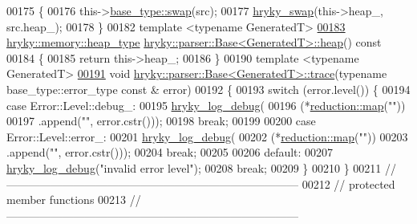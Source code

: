 \begin{DoxyCode}
00175 \{
00176     this->\hyperlink{namespacehryky_1_1parser_acbeac181da6c2a9f92e921f9133cfa8f}{base_type::swap}(src);
00177     \hyperlink{namespacehryky_add9c1c1fdfda07cd47bcb7c16d3a823a}{hryky_swap}(this->heap\_, src.heap\_);
00178 \}
00182 \textcolor{keyword}{template} <\textcolor{keyword}{typename} GeneratedT>
\hypertarget{parser__base_8h_source_l00183}{}\hyperlink{classhryky_1_1parser_1_1_base_ade0723cedb648d9850423cc04fe4bdcf}{00183} \hyperlink{classhryky_1_1memory_1_1heap_1_1_base}{hryky::memory::heap_type} \hyperlink{namespacehryky_1_1memory_1_1global_a6fc6103f67c837aa0f39b359588409cd}{hryky::parser::Base<GeneratedT>::heap}()\textcolor{keyword}{ const}
00184 \textcolor{keyword}{}\{
00185     \textcolor{keywordflow}{return} this->heap\_;
00186 \}
00190 \textcolor{keyword}{template} <\textcolor{keyword}{typename} GeneratedT>
\hypertarget{parser__base_8h_source_l00191}{}\hyperlink{classhryky_1_1parser_1_1_base_a28bfa66d197bcf4babb3806bcf3abafa}{00191} \textcolor{keywordtype}{void} \hyperlink{classhryky_1_1parser_1_1_base}{hryky::parser::Base<GeneratedT>::trace}(\textcolor{keyword}{typename} base\_type::error\_type \textcolor{keyword}{
      const} & error)
00192 \{
00193     \textcolor{keywordflow}{switch} (error.level()) \{
00194     \textcolor{keywordflow}{case} Error::Level::debug\_:
00195         \hyperlink{log__writer__common_8h_ad94e7301fdfeec6ecd1cb63b4c81325a}{hryky_log_debug}(
00196             (*\hyperlink{namespacehryky_1_1reduction_ac5eae270cf8047b294dc4ff3e5e11a79}{reduction::map}(\textcolor{stringliteral}{""}))
00197             .append(\textcolor{stringliteral}{""}, error.cstr()));
00198         \textcolor{keywordflow}{break};
00199         
00200     \textcolor{keywordflow}{case} Error::Level::error\_:
00201         \hyperlink{log__writer__common_8h_ad94e7301fdfeec6ecd1cb63b4c81325a}{hryky_log_debug}(
00202             (*\hyperlink{namespacehryky_1_1reduction_ac5eae270cf8047b294dc4ff3e5e11a79}{reduction::map}(\textcolor{stringliteral}{""}))
00203             .append(\textcolor{stringliteral}{""}, error.cstr()));
00204         \textcolor{keywordflow}{break};
00205 
00206     \textcolor{keywordflow}{default}:
00207         \hyperlink{log__writer__common_8h_ad94e7301fdfeec6ecd1cb63b4c81325a}{hryky_log_debug}(\textcolor{stringliteral}{"invalid error level"});
00208         \textcolor{keywordflow}{break};
00209     \}
00210 \}
00211 \textcolor{comment}{//
      ------------------------------------------------------------------------------}
00212 \textcolor{comment}{// protected member functions}
00213 \textcolor{comment}{//
      ------------------------------------------------------------------------------}

\end{DoxyCode}
